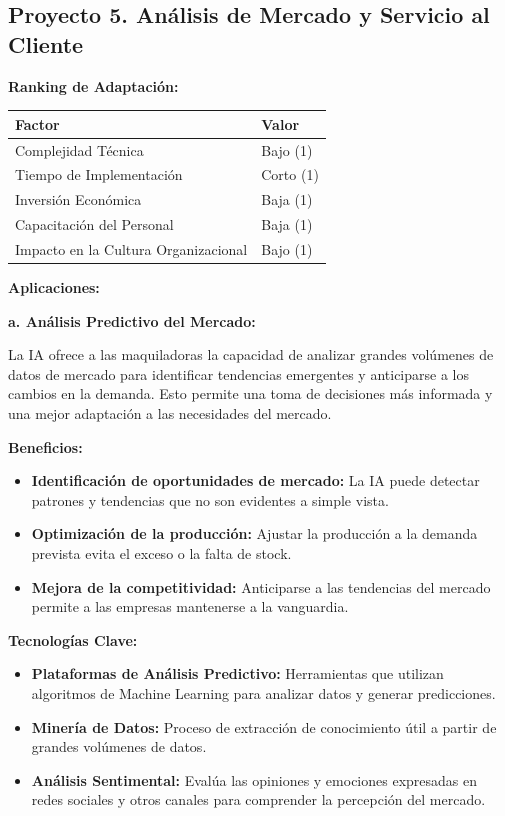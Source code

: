 \documentclass[
  10pt,
  letterpaper,
]{book}
\providecommand{\tightlist}{%
  \setlength{\itemsep}{0pt}\setlength{\parskip}{0pt}}\usepackage{longtable,booktabs,array}
\begin{document}
\subsection{Proyecto 5. Análisis de Mercado y Servicio al
Cliente}\label{proyecto-5.-anuxe1lisis-de-mercado-y-servicio-al-cliente}

\textbf{Ranking de Adaptación:}

\begin{longtable}[]{@{}ll@{}}
\toprule\noalign{}
Factor & Valor \\
\midrule\noalign{}
\endhead
\bottomrule\noalign{}
\endlastfoot
Complejidad Técnica & Bajo (1) \\
Tiempo de Implementación & Corto (1) \\
Inversión Económica & Baja (1) \\
Capacitación del Personal & Baja (1) \\
Impacto en la Cultura Organizacional & Bajo (1) \\
\end{longtable}

\textbf{Aplicaciones:}

\textbf{a. Análisis Predictivo del Mercado:}

La IA ofrece a las maquiladoras la capacidad de analizar grandes
volúmenes de datos de mercado para identificar tendencias emergentes y
anticiparse a los cambios en la demanda. Esto permite una toma de
decisiones más informada y una mejor adaptación a las necesidades del
mercado.

\textbf{Beneficios:}

\begin{itemize}
\tightlist
\item
  \textbf{Identificación de oportunidades de mercado:} La IA puede
  detectar patrones y tendencias que no son evidentes a simple vista.
\item
  \textbf{Optimización de la producción:} Ajustar la producción a la
  demanda prevista evita el exceso o la falta de stock.
\item
  \textbf{Mejora de la competitividad:} Anticiparse a las tendencias del
  mercado permite a las empresas mantenerse a la vanguardia.
\end{itemize}

\textbf{Tecnologías Clave:}

\begin{itemize}
\tightlist
\item
  \textbf{Plataformas de Análisis Predictivo:} Herramientas que utilizan
  algoritmos de Machine Learning para analizar datos y generar
  predicciones.
\item
  \textbf{Minería de Datos:} Proceso de extracción de conocimiento útil
  a partir de grandes volúmenes de datos.
\item
  \textbf{Análisis Sentimental:} Evalúa las opiniones y emociones
  expresadas en redes sociales y otros canales para comprender la
  percepción del mercado.
\end{itemize}
\end{document}
